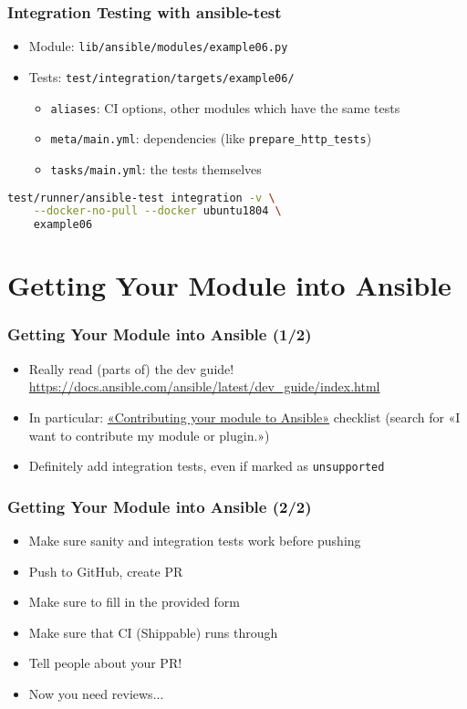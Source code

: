 \documentclass{beamer}
\begin{document}
  \begin{frame}[fragile]
    \frametitle{Integration Testing with ansible-test}
    \begin{itemize}
      \item Module: \lstinline{lib/ansible/modules/example06.py}
      \item Tests: \lstinline{test/integration/targets/example06/}
      \begin{itemize}
        \item \lstinline{aliases}: CI options, other modules which have the same tests
        \item \lstinline{meta/main.yml}: dependencies (like \lstinline{prepare_http_tests})
        \item \lstinline{tasks/main.yml}: the tests themselves
      \end{itemize}
    \end{itemize}

\begin{lstlisting}[language=bash, numbers=none]
test/runner/ansible-test integration -v \
    --docker-no-pull --docker ubuntu1804 \
    example06
\end{lstlisting}
  \end{frame}

  \section{Getting Your Module into Ansible}
  \begin{frame}
    \frametitle{Getting Your Module into Ansible (1/2)}
    \begin{itemize}
      \item \alert{Really read (parts of) the dev guide!}
      \url{https://docs.ansible.com/ansible/latest/dev_guide/index.html}
      \item In particular: \href{https://docs.ansible.com/ansible/latest/dev_guide/developing_modules_checklist.html}{\alert{«Contributing your module to Ansible»}} checklist
      (search for «I want to contribute my module or plugin.»)
      \item Definitely \alert{add} integration \alert{tests}, even if marked
      as \lstinline{unsupported}
    \end{itemize}
  \end{frame}

  \begin{frame}
    \frametitle{Getting Your Module into Ansible (2/2)}
    \begin{itemize}
      \item Make sure sanity and integration tests work before pushing
      \item Push to GitHub, create PR
      \item Make sure to fill in the provided form
      \item Make sure that CI (Shippable) runs through
      \item Tell people about your PR!
      \item<2-> Now you need \alert{reviews}...
    \end{itemize}
  \end{frame}
\end{document}
